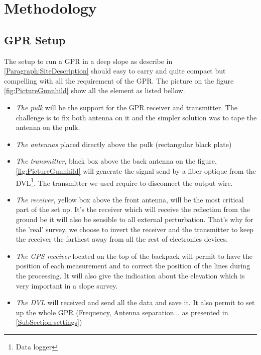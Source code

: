 \newpage
\section{Methodology} \label{Section:Methodology}


\subsection{GPR Setup}

The setup to run a GPR in a deep slope as describe in \ref{Paragraph:SiteDescription} should easy to carry and quite compact but compelling with all the requirement of the GPR. The picture on the figure \ref{fig:PictureGunnhild} show all the element as listed bellow.

\begin{itemize}
    \item \emph{The pulk} will be the support for the GPR receiver and transmitter. The challenge is to fix both antenna on it and the simpler solution was to tape the antenna on the pulk.
    \item \emph{The antennas} placed directly above the pulk (rectangular black plate)
    \item \emph{The transmitter}, black box above the back antenna on the figure, \ref{fig:PictureGunnhild} will generate the signal send by a fiber optique from the DVL\footnote{Data logger}. The transmitter we used require to disconnect the output wire.
    \item \emph{The receiver}, yellow box above the front antenna, will be the most critical part of the set up. It's the receiver which will receive the reflection from the ground be it will also be sensible to all external perturbation. That's why for the 'real' survey, we choose to invert the receiver and the transmitter to keep the receiver the farthest away from all the rest of electronics devices.
    \item \emph{The GPS receiver} located on the top of the backpack will permit to have the position of each measurement and to correct the position of the lines during the processing. It will also give the indication about the elevation which is very important in a slope survey.
    \item \emph{The DVL} will received and send all the data and save it. It also permit to set up the whole GPR (Frequency, Antenna separation... as presented in \ref{SubSection:settings})
\end{itemize}

